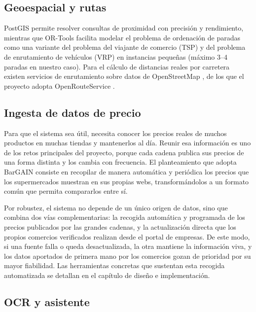 \subsection{Geoespacial y rutas}

PostGIS \cite{postgis_docs, postgis_in_action} permite resolver consultas de proximidad con
precisi\'on y rendimiento, mientras que OR-Tools \cite{ortools_docs} facilita modelar el
problema de ordenaci\'on de paradas como una variante del problema del viajante de comercio (TSP)
y del problema de enrutamiento de veh\'iculos (VRP) \cite{tsp_study} en instancias peque\~nas
(m\'aximo 3--4 paradas en nuestro caso). Para el c\'alculo de distancias reales por carretera
existen servicios de enrutamiento sobre datos de OpenStreetMap \cite{osrm_2011}, de los que el
proyecto adopta OpenRouteService \cite{ors_docs}.

\subsection{Ingesta de datos de precio}

Para que el sistema sea \'util, necesita conocer los precios reales de muchos productos en muchas
tiendas y mantenerlos al d\'ia. Reunir esa informaci\'on es uno de los retos principales del
proyecto, porque cada cadena publica sus precios de una forma distinta y los cambia con
frecuencia. El planteamiento que adopta BarGAIN consiste en recopilar de manera autom\'atica y
peri\'odica los precios que los supermercados muestran en sus propias webs, transform\'andolos a
un formato com\'un que permita compararlos entre s\'i.

Por robustez, el sistema no depende de un \'unico origen de datos, sino que combina dos v\'ias
complementarias: la recogida autom\'atica y programada de los precios publicados por las grandes
cadenas, y la actualizaci\'on directa que los propios comercios verificados realizan desde el
portal de empresas. De este modo, si una fuente falla o queda desactualizada, la otra mantiene la
informaci\'on viva, y los datos aportados de primera mano por los comercios gozan de prioridad por
su mayor fiabilidad. Las herramientas concretas que sustentan esta recogida automatizada se
detallan en el cap\'itulo de dise\~no e implementaci\'on.

\subsection{OCR y asistente}

